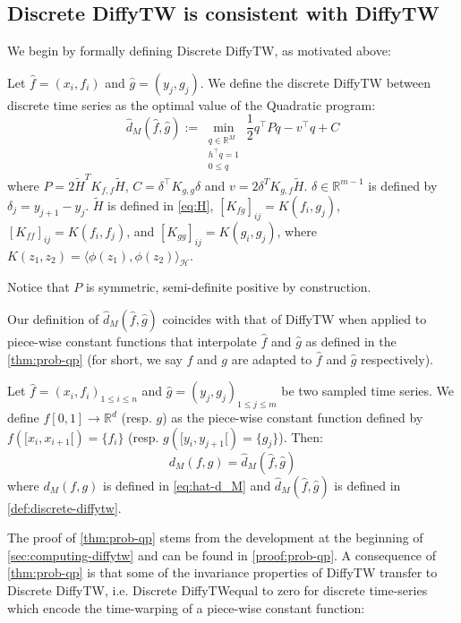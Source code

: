 \subsection{Discrete DiffyTW is consistent with DiffyTW}\label{sec:consistent}
We begin by formally defining Discrete DiffyTW, as motivated above:
\begin{definition}\label{def:discrete-diffytw} Let $\hat f = (x_i, f_i)$ and $\hat g= (y_j, g_j)$. We define the discrete DiffyTW between discrete time series as the optimal value of the Quadratic program:
\begin{equation}\label{prob:qp}
    \hat d_M(\hat f, \hat g) :=\min_{\substack{q\in\mathbb R^{M}\\h^\top q=1\\0 \leq q}}\frac{1}{2}q^\top Pq - v^\top q + C
\end{equation}
where $P= 2\tilde H^TK_{f, f}\tilde H$, $C= \delta^\top K_{g,g}\delta$ and $v= 2 \delta^TK_{g,f}\tilde H$. $\delta\in\mathbb R^{m-1}$ is defined by $\delta_j = y_{j+1} - y_j$. $\tilde H$ is defined in \cref{eq:H}, $[K_{fg}]_{ij} = K(f_i, g_j)$, $[K_{ff}]_{ij} = K(f_i, f_j)$, and $[K_{gg}]_{ij} = K(g_i, g_j)$, where $K(z_1, z_2) = \langle \phi(z_1), \phi(z_2)\rangle_\mathcal H$.
\end{definition}
Notice that $P$ is symmetric, semi-definite positive by construction.

Our definition of $\hat d_M(\hat f, \hat g)$ coincides with that of DiffyTW when applied to piece-wise constant functions that interpolate $\hat f$ and $\hat g$ as defined in the \cref{thm:prob-qp} (for short, we say $f$ and $g$ are adapted to $\hat f$ and $\hat g$ respectively).

\begin{theorem}\label{thm:prob-qp}
Let $\hat f = (x_i, f_i)_{1 \leq i\leq n}$ and $\hat g = (y_j, g_j)_{1 \leq j\leq m}$ be two sampled time series. We define $f[0, 1]\to\mathbb R^d$ (resp. $g$) as the piece-wise constant function defined by $f([x_i, x_{i+1}[) = \lbrace f_i\rbrace$ (resp. $g([y_i, y_{j+1}[) = \lbrace g_j\rbrace$). Then:
\begin{equation}
d_M(f, g) = \hat d_M(\hat f, \hat g)
\end{equation}
where $d_M(f, g)$ is defined in \cref{eq:hat-d_M} and $\hat d_M(\hat f, \hat g)$ is defined in \cref{def:discrete-diffytw}.
\end{theorem}

The proof of \cref{thm:prob-qp} stems from the development at the beginning of \cref{sec:computing-diffytw} and can be found in \cref{proof:prob-qp}. A consequence of \cref{thm:prob-qp} is that some of the invariance properties of DiffyTW transfer to Discrete DiffyTW, i.e. Discrete DiffyTWequal to zero for discrete time-series which encode the time-warping of a piece-wise constant function:

